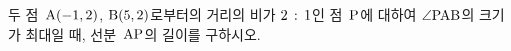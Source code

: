 두 점~$\mathrm{A}(-1{,}\mkern3mu\mathopen{}2)$, $\mathrm{B}(5{,}\mkern3mu\mathopen{}2)$로부터의 거리의 비가 $2\mkern3mu :\mkern3mu 1$인 점~$\mathrm{P}$에 대하여 $\angle\mathrm{PAB}$의 크기가 최대일 때, 선분~$\mathrm{AP}$의 길이를 구하시오.
